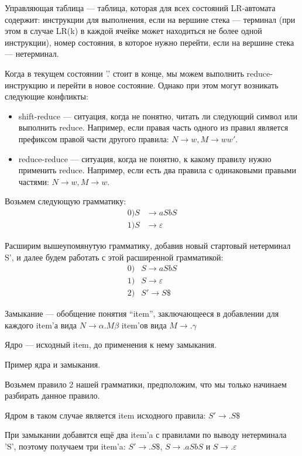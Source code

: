 \begin{definition}
Управляющая таблица --- таблица, которая для всех состояний LR-автомата содержит: инструкции для выполнения, если на вершине стека --- терминал (при этом в случае LR(k) в каждой ячейке может находиться не более одной инструкции), номер состояния, в которое нужно перейти, если на вершине стека --- нетерминал.
\end{definition}

Когда в текущем состоянии '.' стоит в конце, мы можем выполнить reduce-инструкцию и перейти в новое состояние. Однако при этом могут возникать следующие конфликты:
\begin{itemize}
\item shift-reduce --- ситуация, когда не понятно, читать ли следующий символ или выполнить reduce. Например, если правая часть одного из правил является префиксом правой части другого правила: $N \rightarrow w, M \rightarrow ww'$.
\item reduce-reduce --- ситуация, когда не понятно, к какому правилу нужно применить reduce. Например, если есть два правила с одинаковыми правыми частями: $N \rightarrow w, M \rightarrow w$.
\end{itemize}

Возьмем следующую грамматику:
\begin{align*}
0) S & \rightarrow a S b S \\
1) S & \rightarrow \varepsilon
\end{align*}

Расширим вышеупомянутую грамматику, добавив новый стартовый нетерминал S', и далее будем работать с этой расширенной грамматикой:
\begin{align*}
0) & S \rightarrow a S b S \\
1) & S \rightarrow \varepsilon \\
2) & S' \rightarrow S \$
\end{align*}

\begin{definition}
Замыкание --- обобщение понятия ``item'', заключающееся в добавлении для каждого item'а вида $N \rightarrow \alpha.M\beta$ item'ов вида $M \rightarrow .\gamma$
\end{definition}

\begin{definition}
Ядро --- исходный item, до применения к нему замыкания.
\end{definition}

\begin{example}
Пример ядра и замыкания. 

Возьмем правило 2 нашей грамматики, предположим, что мы только начинаем разбирать данное правило.

Ядром в таком случае является item исходного правила: $S' \rightarrow .S \$$

При замыкании добавятся ещё два item'a с правилами по выводу нетерминала 'S', поэтому получаем три item'a: $S' \rightarrow .S\$$, $S \rightarrow .aSbS$ и $S \rightarrow .\varepsilon$
\end{example}

